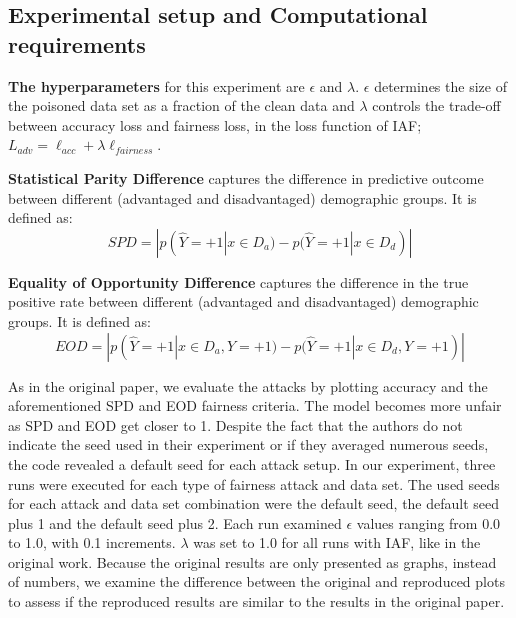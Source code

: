



\subsection{Experimental setup and Computational requirements}
\label{sec:experimental setup}

\textbf{The hyperparameters} for this experiment are $\epsilon$ and $\lambda$. $\epsilon$ determines the size of the poisoned data set as a fraction of the clean data and $\lambda$ controls the trade-off between accuracy loss and fairness loss, in the loss function of IAF; $L_{adv} = \ell_{acc} + \lambda \ell_{fairness}$.

\textbf{Statistical Parity Difference}
captures the difference in predictive outcome between different (advantaged and disadvantaged) demographic groups. It is defined as:
\begin{equation}
    SPD = |p(\hat{Y}=+1|x\in D_a)-p(\hat{Y}=+1|x\in D_d)|
\end{equation}

\textbf{Equality of Opportunity Difference} captures the difference in the true positive rate between different (advantaged and disadvantaged) demographic groups. It is defined as:
\begin{equation}
    EOD = |p(\hat{Y}=+1|x\in D_a, Y=+1)-p(\hat{Y}=+1|x\in D_d, Y=+1)|
\end{equation}

As in the original paper, we evaluate the attacks by plotting accuracy and the aforementioned SPD and EOD fairness criteria. The model becomes more unfair as SPD and EOD get closer to 1.
Despite the fact that the authors do not indicate the seed used in their experiment or if they averaged numerous seeds, the code revealed a default seed for each attack setup. 
In our experiment, three runs were executed for each type of fairness attack and data set. The used seeds for each attack and data set combination were the default seed, the default seed plus 1 and the default seed plus 2. Each run examined $\epsilon$ values ranging from 0.0 to 1.0, with 0.1 increments. $\lambda$ was set to 1.0 for all runs with IAF, like in the original work.
Because the original results are only presented as graphs, instead of numbers, we examine the difference between the original and reproduced plots to assess if the reproduced results are similar to the results in the original paper.

